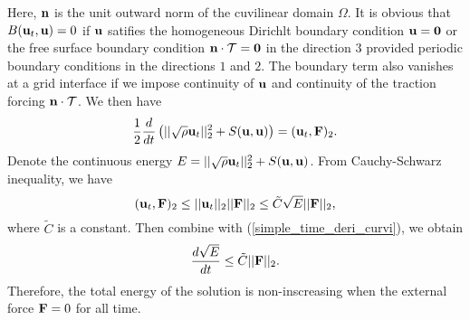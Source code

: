 Here, ${\bf n}$ is the unit outward norm of the cuvilinear domain $\Omega$. It is obvious that $B({\bf u}_t, {\bf u}) = 0$ if ${\bf u}$ satifies the homogeneous Dirichlt boundary condition ${\bf u} = {\bf 0}$ or the free surface boundary condition ${\bf n}\cdot\mathcal{T} = {\bf 0}$ in the direction $3$ provided periodic boundary conditions in the directions $1$ and $2$. The boundary term also vanishes at a grid interface if we impose continuity of ${\bf u}$ and continuity of the traction forcing ${\bf n}\cdot\mathcal{T}$. We then have 
\begin{equation}\label{simple_time_deri_curvi}
\frac{1}{2}\frac{d}{dt} \left(||\sqrt{\rho}{\bf u}_t||_2^2 + S({\bf u},{\bf u})\right) =  ({\bf u}_t,{\bf F})_2.
\end{equation}
Denote the continuous energy ${E} = ||\sqrt{\rho}{\bf u}_t||_2^2 + S({\bf u},{\bf u})$. From Cauchy-Schwarz inequality, we have
\begin{equation*}
({\bf u}_t,{\bf F})_2\leq ||{\bf u}_t||_2 ||{\bf F}||_2\leq \tilde {C}\sqrt{E}||{\bf F}||_2,
\end{equation*}
where $\tilde{C}$ is a constant. Then combine with (\ref{simple_time_deri_curvi}), we obtain
\begin{equation*}
\frac{d\sqrt{E}}{dt} \leq \tilde{C}||{\bf F}||_2.
\end{equation*}
Therefore, the total energy of the solution is non-inscreasing when the external force ${\bf F} = 0$ for all time.